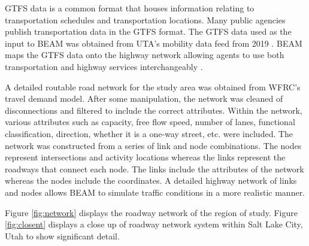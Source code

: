 \documentclass[3p, authoryear, review]{elsarticle} %
\begin{document}
GTFS data is a common format that houses information relating to transportation schedules and transportation locations. Many public agencies publish transportation data in the GTFS format. The GTFS data used as the input to BEAM was obtained from UTA's mobility data feed from 2019 \citep{gtfs}. BEAM maps the GTFS data onto the highway network allowing agents to use both transportation and highway services interchangeably \citep{nate}.

A detailed routable road network for the study area was obtained from WFRC's travel demand model. After some manipulation, the network was cleaned of disconnections and filtered to include the correct attributes. Within the network, various attributes such as capacity, free flow speed, number of lanes, functional classification, direction, whether it is a one-way street, etc. were included. The network was constructed from a series of link and node combinations. The nodes represent intersections and activity locations whereas the links represent the roadways that connect each node. The links include the attributes of the network whereas the nodes include the coordinates. A detailed highway network of links and nodes allows BEAM to simulate traffic conditions in a more realistic manner.

Figure \ref{fig:network} displays the roadway network of the region of study. Figure \ref{fig:closent} displays a close up of roadway network system within Salt Lake City, Utah to show significant detail.
\end{document}
